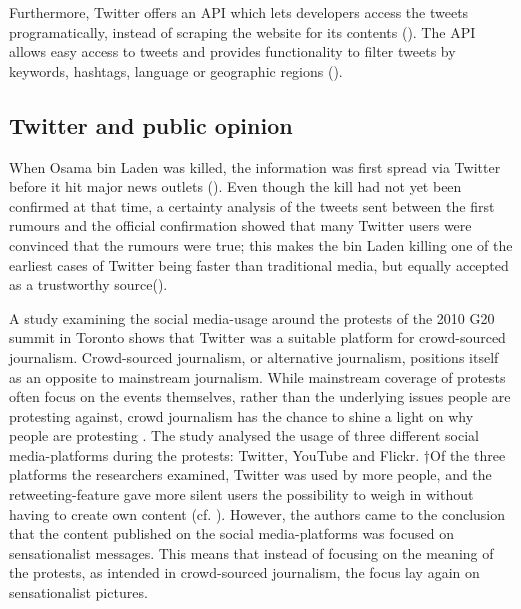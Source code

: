 Furthermore, Twitter offers an API which lets developers access the tweets programatically, instead of scraping the website for its contents (\cite{twitter_inc_about_nodate}). The API allows easy access to tweets and provides functionality to filter tweets by keywords, hashtags, language or geographic regions (\cite{bello2017detecting}).

\subsection{Twitter and public opinion}  %
When Osama bin Laden was killed, the information was first spread via Twitter before it hit major news outlets (\cite{hu2012breaking}). 
Even though the kill had not yet been confirmed at that time, a certainty analysis of the tweets sent between the first rumours and the official confirmation showed that many Twitter users were convinced that the rumours were true; this makes the bin Laden killing one of the earliest cases of Twitter being faster than traditional media, but equally accepted as a trustworthy source(\cite[2751]{hu2012breaking}).

A study examining the social media-usage around the protests of the 2010 G20 summit in Toronto shows that Twitter was a suitable platform for crowd-sourced journalism\cite{poell2012twitter}. Crowd-sourced journalism, or alternative journalism, positions itself as an opposite to mainstream journalism. While mainstream coverage of protests often focus on the events themselves, rather than the underlying issues people are protesting against, crowd journalism has the chance to shine a light on why people are protesting \cite[698]{poell2012twitter}. The study analysed the usage of three different social media-platforms during the protests: Twitter, YouTube and Flickr. †Of the three platforms the researchers examined, Twitter was used by more people, and the retweeting-feature gave more silent users the possibility to weigh in without having to create own content (cf. \cite[709]{poell2012twitter}). However, the authors came to the conclusion that the content published on the social media-platforms was focused on sensationalist messages. This means that instead of focusing on the meaning of the protests, as intended in crowd-sourced journalism, the focus lay again on sensationalist pictures.



